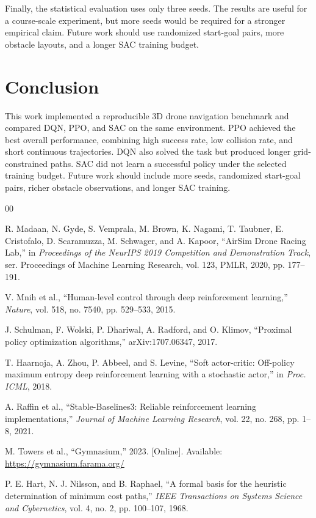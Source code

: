 \documentclass[conference]{IEEEtran}
\begin{document}
Finally, the statistical evaluation uses only three seeds. The results are
useful for a course-scale experiment, but more seeds would be required for a
stronger empirical claim. Future work should use randomized start-goal pairs,
more obstacle layouts, and a longer SAC training budget.

\section{Conclusion}

This work implemented a reproducible 3D drone navigation benchmark and compared
DQN, PPO, and SAC on the same environment. PPO achieved the best overall
performance, combining high success rate, low collision rate, and short
continuous trajectories. DQN also solved the task but produced longer
grid-constrained paths. SAC did not learn a successful policy under the
selected training budget. Future work should include more seeds, randomized
start-goal pairs, richer obstacle observations, and longer SAC training.

\begin{thebibliography}{00}

R. Madaan, N. Gyde, S. Vemprala, M. Brown, K. Nagami, T. Taubner,
E. Cristofalo, D. Scaramuzza, M. Schwager, and A. Kapoor, ``AirSim Drone
Racing Lab,'' in \emph{Proceedings of the NeurIPS 2019 Competition and
Demonstration Track}, ser. Proceedings of Machine Learning Research, vol. 123,
PMLR, 2020, pp. 177--191.

V. Mnih et al., ``Human-level control through deep reinforcement learning,''
\emph{Nature}, vol. 518, no. 7540, pp. 529--533, 2015.

J. Schulman, F. Wolski, P. Dhariwal, A. Radford, and O. Klimov, ``Proximal
policy optimization algorithms,'' arXiv:1707.06347, 2017.

T. Haarnoja, A. Zhou, P. Abbeel, and S. Levine, ``Soft actor-critic:
Off-policy maximum entropy deep reinforcement learning with a stochastic
actor,'' in \emph{Proc. ICML}, 2018.

A. Raffin et al., ``Stable-Baselines3: Reliable reinforcement learning
implementations,'' \emph{Journal of Machine Learning Research}, vol. 22,
no. 268, pp. 1--8, 2021.

M. Towers et al., ``Gymnasium,'' 2023. [Online]. Available:
\url{https://gymnasium.farama.org/}

P. E. Hart, N. J. Nilsson, and B. Raphael, ``A formal basis for the heuristic
determination of minimum cost paths,'' \emph{IEEE Transactions on Systems
Science and Cybernetics}, vol. 4, no. 2, pp. 100--107, 1968.

\end{thebibliography}
\end{document}
